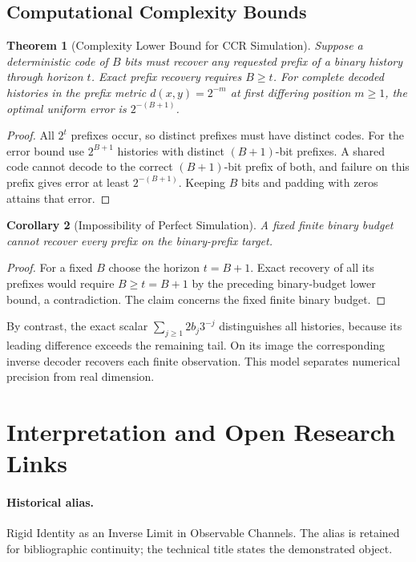 \documentclass[11pt,a4paper]{article}
\theoremstyle{plain}
\newtheorem{theorem}{Theorem}[section]
\newtheorem{corollary}[theorem]{Corollary}
\theoremstyle{definition}
\theoremstyle{remark}
\begin{document}
\subsection{Computational Complexity Bounds}

\begin{theorem}[Complexity Lower Bound for CCR Simulation]
Suppose a deterministic code of $B$ bits must recover any requested prefix of a binary history through horizon $t$. Exact prefix recovery requires $B\geq t$. For complete decoded histories in the prefix metric $d(x,y)=2^{-m}$ at first differing position $m\geq1$, the optimal uniform error is $2^{-(B+1)}$.
\end{theorem}
\begin{proof}
All $2^t$ prefixes occur, so distinct prefixes must have distinct codes. For the error bound use $2^{B+1}$ histories with distinct $(B+1)$-bit prefixes. A shared code cannot decode to the correct $(B+1)$-bit prefix of both, and failure on this prefix gives error at least $2^{-(B+1)}$. Keeping $B$ bits and padding with zeros attains that error.
\end{proof}

\begin{corollary}[Impossibility of Perfect Simulation]
A fixed finite binary budget cannot recover every prefix on the binary-prefix target.
\end{corollary}
\begin{proof}
For a fixed $B$ choose the horizon $t=B+1$. Exact recovery of all its prefixes
would require $B\geq t=B+1$ by the preceding binary-budget lower bound,
a contradiction. The claim concerns the fixed finite binary budget.
\end{proof}

By contrast, the exact scalar $\sum_{j\geq1}2b_j3^{-j}$ distinguishes all histories, because its leading difference exceeds the remaining tail. On its image the corresponding inverse decoder recovers each finite observation. This model separates numerical precision from real dimension.

\section{Interpretation and Open Research Links}\label{sec:interpretation-open-links}
\paragraph{Historical alias.} Rigid Identity as an Inverse Limit in Observable Channels. The alias is retained for bibliographic continuity; the technical title states the demonstrated object.
\end{document}
